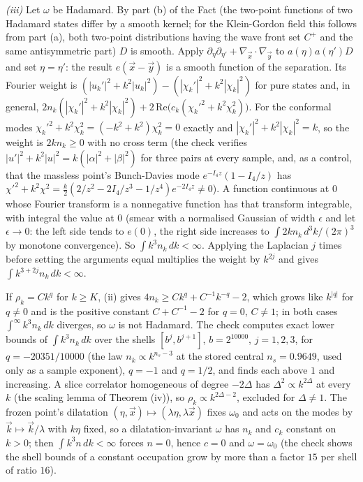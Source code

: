 \emph{(iii)} Let $\omega$ be Hadamard. By part (b) of the Fact (the two-point functions of two Hadamard states differ by a smooth kernel; for the Klein-Gordon field this follows from part (a), both two-point distributions having the wave front set $C^{+}$ and the same antisymmetric part) $D$ is smooth. Apply $\partial_{\eta}\partial_{\eta'} + \nabla_{\vec x}\cdot\nabla_{\vec y}$ to $a(\eta)a(\eta')D$ and set $\eta = \eta'$: the result $e(\vec x - \vec y)$ is a smooth function of the separation. Its Fourier weight is $(|u_{k}'|^{2} + k^{2}|u_{k}|^{2}) - (|\chi_{k}'|^{2} + k^{2}|\chi_{k}|^{2})$ for pure states and, in general, $2n_{k}(|\chi_{k}'|^{2} + k^{2}|\chi_{k}|^{2}) + 2\,\mathrm{Re}\bigl(c_{k}(\chi_{k}'^{2} + k^{2}\chi_{k}^{2})\bigr)$. For the conformal modes $\chi_{k}'^{2} + k^{2}\chi_{k}^{2} = (-k^{2} + k^{2})\chi_{k}^{2} = 0$ exactly and $|\chi_{k}'|^{2} + k^{2}|\chi_{k}|^{2} = k$, so the weight is $2kn_{k} \ge 0$ with no cross term (the check verifies $|u'|^{2} + k^{2}|u|^{2} = k(|\alpha|^{2} + |\beta|^{2})$ for three pairs at every sample, and, as a control, that the massless point's Bunch-Davies mode $e^{-I_{4}z}(1 - I_{4}/z)$ has $\chi'^{2} + k^{2}\chi^{2} = \tfrac{k}{2}(2/z^{2} - 2I_{4}/z^{3} - 1/z^{4})e^{-2I_{4}z} \neq 0$). A function continuous at $0$ whose Fourier transform is a nonnegative function has that transform integrable, with integral the value at $0$ (smear with a normalised Gaussian of width $\epsilon$ and let $\epsilon \to 0$: the left side tends to $e(0)$, the right side increases to $\int 2kn_{k}\,d^{3}k/(2\pi)^{3}$ by monotone convergence). So $\int k^{3}n_{k}\,dk < \infty$. Applying the Laplacian $j$ times before setting the arguments equal multiplies the weight by $k^{2j}$ and gives $\int k^{3 + 2j}n_{k}\,dk < \infty$.

If $\rho_{k} = Ck^{q}$ for $k \ge K$, (ii) gives $4n_{k} \ge Ck^{q} + C^{-1}k^{-q} - 2$, which grows like $k^{|q|}$ for $q \neq 0$ and is the positive constant $C + C^{-1} - 2$ for $q = 0$, $C \neq 1$; in both cases $\int^{\infty}k^{3}n_{k}\,dk$ diverges, so $\omega$ is not Hadamard. The check computes exact lower bounds of $\int k^{3}n_{k}\,dk$ over the shells $[b^{j}, b^{j+1}]$, $b = 2^{10000}$, $j = 1, 2, 3$, for $q = -20351/10000$ (the law $n_{k} \propto k^{n_{s} - 3}$ at the stored central $n_{s} = 0.9649$, used only as a sample exponent), $q = -1$ and $q = 1/2$, and finds each above $1$ and increasing. A slice correlator homogeneous of degree $-2\Delta$ has $\Delta^{2} \propto k^{2\Delta}$ at every $k$ (the scaling lemma of Theorem (iv)), so $\rho_{k} \propto k^{2\Delta - 2}$, excluded for $\Delta \neq 1$. The frozen point's dilatation $(\eta, \vec x) \mapsto (\lambda\eta, \lambda\vec x)$ fixes $\omega_{0}$ and acts on the modes by $\vec k \mapsto \vec k/\lambda$ with $k\eta$ fixed, so a dilatation-invariant $\omega$ has $n_{k}$ and $c_{k}$ constant on $k > 0$; then $\int k^{3}n\,dk < \infty$ forces $n = 0$, hence $c = 0$ and $\omega = \omega_{0}$ (the check shows the shell bounds of a constant occupation grow by more than a factor $15$ per shell of ratio $16$).

